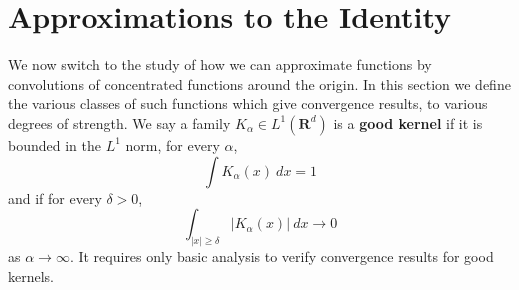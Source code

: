 \section{Approximations to the Identity}

We now switch to the study of how we can approximate functions by convolutions of concentrated functions around the origin. In this section we define the various classes of such functions which give convergence results, to various degrees of strength. We say a family $K_\alpha \in L^1(\mathbf{R}^d)$ is a {\bf good kernel} if it is bounded in the $L^1$ norm, for every $\alpha$,
    \[ \int K_\alpha(x)\ dx = 1 \]
    and if for every $\delta > 0$,
    \[ \int_{|x| \geq \delta} |K_\alpha(x)|\ dx \to 0 \]
    as $\alpha \to \infty$.
%
It requires only basic analysis to verify convergence results for good kernels.

